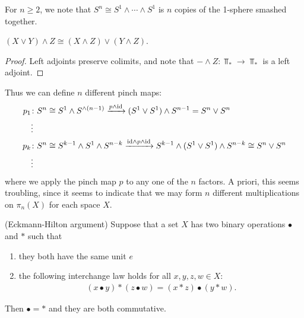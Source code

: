 \documentclass{article}[11pt]
\newcommand{\smashprod}{\wedge} %
\renewcommand{\dot}{\bullet }
\begin{document}
For $n\geq 2$, we note that $S^n \cong S^1 \smashprod \cdots \smashprod S^1$ is $n$ copies of the 1-sphere smashed together.



	\begin{exercise} $(X\vee Y)\smashprod Z \cong (X\smashprod Z)\vee (Y\smashprod Z)$.
	\end{exercise}
	\begin{proof} Left adjoints preserve colimits, and note that $-\smashprod Z \colon\Top_\ast \to \Top_\ast$ is a left adjoint.
	\end{proof}

	Thus we can define $n$ different pinch maps:
	\begin{align*}
		p_1 &\colon S^n \cong S^1 \smashprod S^{\smashprod (n-1)} \xto {p\smashprod \id} (S^1 \vee S^1)\smashprod S^{n-1} = S^n \vee S^n \\
		&\vdots \\
		p_k &\colon S^n \cong S^{k-1}\smashprod S^1 \smashprod S^{n-k} \xto{\id\smashprod p \smashprod \id} S^{k-1}\smashprod (S^1 \vee S^1)\smashprod S^{n-k} \cong S^n \vee S^n \\
		&\vdots
	\end{align*}
	where we apply the pinch map $p$ to any one of the $n$ factors. A priori, this seems troubling, since it seems to indicate that we may form $n$ different multiplications on $\pi_n(X)$ for each space $X$.

	\begin{lemma} (Eckmann-Hilton argument) Suppose that a set $X$ has two binary operations $\dot$ and $\ast$ such that
	\begin{enumerate}
		\item they both have the same unit $e$
		\item the following interchange law holds for all $x,y,z,w \in X$:
		\begin{align*}
			(x\dot y)\ast(z\dot w) = (x\ast z)\dot (y\ast w).
		\end{align*}
	\end{enumerate}
	Then $\dot = \ast$ and they are both commutative.
	\end{lemma}
	

	
	
\end{document}
